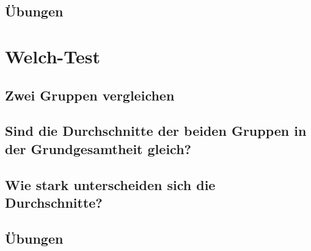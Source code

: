 \documentclass[
]{book}
\theoremstyle{definition}
\theoremstyle{definition}
\theoremstyle{definition}
\theoremstyle{definition}
\theoremstyle{remark}
\begin{document}
\section{Übungen}\label{uxfcbungen-4}

\chapter{Welch-Test}\label{welch-test}

\section{Zwei Gruppen vergleichen}\label{zwei-gruppen-vergleichen-1}

\section{Sind die Durchschnitte der beiden Gruppen in der Grundgesamtheit gleich?}\label{sind-die-durchschnitte-der-beiden-gruppen-in-der-grundgesamtheit-gleich}

\section{Wie stark unterscheiden sich die Durchschnitte?}\label{wie-stark-unterscheiden-sich-die-durchschnitte}

\section{Übungen}\label{uxfcbungen-5}

  
\end{document}
